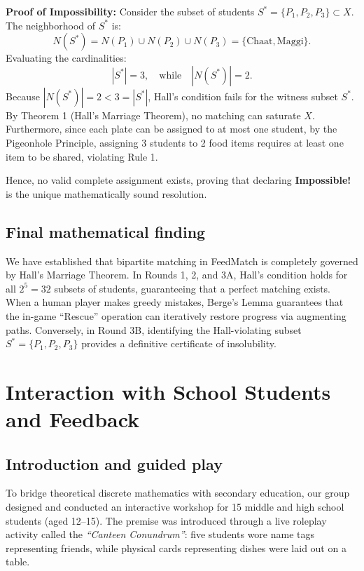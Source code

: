 \documentclass[11pt,a4paper]{article}
\begin{document}
\textbf{Proof of Impossibility:} 
Consider the subset of students $S^* = \{P_1, P_2, P_3\} \subset X$. 
The neighborhood of $S^*$ is:
\[
  N(S^*) = N(P_1) \cup N(P_2) \cup N(P_3) = \{\text{Chaat}, \text{Maggi}\}.
\]
Evaluating the cardinalities:
\[
  |S^*| = 3, \quad \text{while} \quad |N(S^*)| = 2.
\]
Because $|N(S^*)| = 2 < 3 = |S^*|$, Hall's condition fails for the witness subset $S^*$. By Theorem 1 (Hall's Marriage Theorem), no matching can saturate $X$. Furthermore, since each plate can be assigned to at most one student, by the Pigeonhole Principle, assigning 3 students to 2 food items requires at least one item to be shared, violating Rule 1. 

Hence, no valid complete assignment exists, proving that declaring \textbf{Impossible!} is the unique mathematically sound resolution.

\subsection*{Final mathematical finding}
We have established that bipartite matching in FeedMatch is completely governed by Hall's Marriage Theorem. In Rounds 1, 2, and 3A, Hall's condition holds for all $2^5 = 32$ subsets of students, guaranteeing that a perfect matching exists. When a human player makes greedy mistakes, Berge's Lemma guarantees that the in-game ``Rescue'' operation can iteratively restore progress via augmenting paths. Conversely, in Round 3B, identifying the Hall-violating subset $S^* = \{P_1, P_2, P_3\}$ provides a definitive certificate of insolubility.

\newpage
\section{Interaction with School Students and Feedback}

\subsection*{Introduction and guided play}
To bridge theoretical discrete mathematics with secondary education, our group designed and conducted an interactive workshop for 15 middle and high school students (aged 12--15). The premise was introduced through a live roleplay activity called the \emph{``Canteen Conundrum''}: five students wore name tags representing friends, while physical cards representing dishes were laid out on a table.
\end{document}

